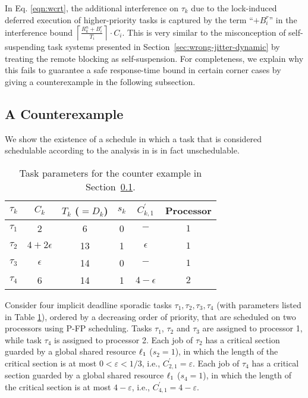 In Eq. \eqref{eqn:wcrt}, the additional interference on $\tau_k$ due to the lock-induced deferred execution of higher-priority tasks is captured by the term ``$+ B^r_i$'' in the interference bound  $\left \lceil \frac{R_k^n + B_i^r}{T_i} \right \rceil \cdot C_i$. This is very similar to the misconception of self-suspending task systems presented in Section~\ref{sec:wrong-jitter-dynamic} by treating the remote blocking as self-suspension. For completeness, we explain why this fails to guarantee a safe response-time bound in certain corner cases by giving a counterexample in the following subsection.

\subsection{A Counterexample}
\label{sec:counterexample}

We show the existence of a schedule in which a task that is considered schedulable according to the analysis in \cite{lakshmanan-2009} is in fact unschedulable.

%

\begin{table}
\centering
    \begin{tabular}{|c|c|c|c|c|c|} 
 \hline
        $\tau_k$ & $C_k$ & $T_k$ ($= D_k$) & $s_k$ & $C_{k,1}^{\prime}$ & Processor\\
        \hline
        $\tau_1$ & 2             & 6  & 0 & $-$ & $1$\\ 
        $\tau_2$ & $4+2\epsilon$ & 13 & 1 & $\epsilon$& $1$\\
        $\tau_3$ & $\epsilon$    & 14 & 0 & $-$ & $1$\\
        $\tau_4$ & 6             & 14 & 1 & $4-\epsilon$ & $2$\\ 
        \hline
    \end{tabular}
    \caption{Task parameters for the counter example in Section~\ref{sec:counterexample}.}
    \label{table:parameters}
\end{table}

Consider four implicit deadline sporadic tasks ${\tau_1, \tau_2, \tau_3, \tau_4}$ (with parameters listed in Table \ref{table:parameters}), ordered by a decreasing order of priority, that are scheduled on two processors using P-FP scheduling. Tasks $\tau_1$, $\tau_2$ and $\tau_3$ are assigned to processor 1, while task $\tau_4$ is assigned to processor 2. Each job of $\tau_2$ has a critical section guarded by a global shared resource $\ell_1$  ($s_2 = 1$), in which the length of the critical section is at most $0 < \varepsilon < 1/3$, i.e., $C_{2,1}^{\prime} = \varepsilon$. 
Each job of $\tau_4$ has a critical section guarded by a global shared resource $\ell_1$  ($s_4 = 1$), in which the length of the critical section is at most $4-\varepsilon$, i.e., $C_{4,1}^{\prime} = 4-\varepsilon$. 

